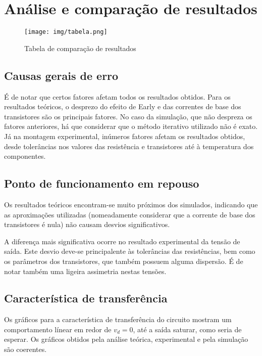 \documentclass[a4paper,2pt]{report}
\begin{document}
\section{Análise e comparação de resultados}

\begin{figure}[H]
    \centering
    \texttt{[image: img/tabela.png]}
    \caption{Tabela de comparação de resultados}
    \label{}
\end{figure}

\subsection{Causas gerais de erro}
\par É de notar que certos fatores afetam todos os resultados obtidos. Para os resultados teóricos, o desprezo do efeito de Early e das correntes de base dos transistores são os principais fatores. No caso da simulação, que não despreza os fatores anteriores, há que considerar que o método iterativo utilizado não é exato. Já na montagem experimental, inúmeros fatores afetam os resultados obtidos, desde tolerâncias nos valores das resistência e transistores até à temperatura dos componentes.

\subsection{Ponto de funcionamento em repouso}
\par Os resultados teóricos encontram-se muito próximos dos simulados, indicando que as aproximações utilizadas (nomeadamente considerar que a corrente de base dos transistores é nula) não causam desvios significativos.
\par A diferença mais significativa ocorre no resultado experimental da tensão de saída. Este desvio deve-se principalente às tolerâncias das resistências, bem como os parâmetros dos transistores, que também possuem alguma dispersão. É de notar também uma ligeira assimetria nestas tensões.

\subsection{Característica de transferência}
\par Os gráficos para a característica de transferência do circuito mostram um comportamento línear em redor de \(v_d = 0\), até a saída saturar, como seria de esperar. Os gráficos obtidos pela análise teórica, experimental e pela simulação são coerentes.
\end{document}
